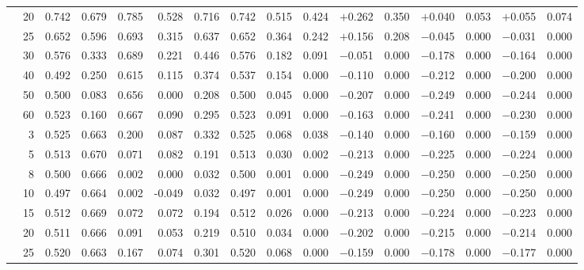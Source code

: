 \documentclass[conference]{IEEEtran}
\theoremstyle{remark}
\begin{document}
\begin{table}[t]
{\begin{tabular}{p{2.2cm}r rrrr rr rr rr rr rr}
  & 20 & 0.742 & 0.679 & 0.785 & 0.528 & 0.716 & 0.742 & 0.515 & 0.424 & $+$0.262 & 0.350 & $+$0.040 & 0.053 & $+$0.055 & 0.074 \\
  & 25 & 0.652 & 0.596 & 0.693 & 0.315 & 0.637 & 0.652 & 0.364 & 0.242 & $+$0.156 & 0.208 & $-$0.045 & 0.000 & $-$0.031 & 0.000 \\
  & 30 & 0.576 & 0.333 & 0.689 & 0.221 & 0.446 & 0.576 & 0.182 & 0.091 & $-$0.051 & 0.000 & $-$0.178 & 0.000 & $-$0.164 & 0.000 \\
  & 40 & 0.492 & 0.250 & 0.615 & 0.115 & 0.374 & 0.537 & 0.154 & 0.000 & $-$0.110 & 0.000 & $-$0.212 & 0.000 & $-$0.200 & 0.000 \\
  & 50 & 0.500 & 0.083 & 0.656 & 0.000 & 0.208 & 0.500 & 0.045 & 0.000 & $-$0.207 & 0.000 & $-$0.249 & 0.000 & $-$0.244 & 0.000 \\
  & 60 & 0.523 & 0.160 & 0.667 & 0.090 & 0.295 & 0.523 & 0.091 & 0.000 & $-$0.163 & 0.000 & $-$0.241 & 0.000 & $-$0.230 & 0.000 \\
\midrule
{}
  & 3  & 0.525 & 0.663 & 0.200 & 0.087 & 0.332 & 0.525 & 0.068 & 0.038 & $-$0.140 & 0.000 & $-$0.160 & 0.000 & $-$0.159 & 0.000 \\
  & 5  & 0.513 & 0.670 & 0.071 & 0.082 & 0.191 & 0.513 & 0.030 & 0.002 & $-$0.213 & 0.000 & $-$0.225 & 0.000 & $-$0.224 & 0.000 \\
  & 8  & 0.500 & 0.666 & 0.002 & 0.000 & 0.032 & 0.500 & 0.001 & 0.000 & $-$0.249 & 0.000 & $-$0.250 & 0.000 & $-$0.250 & 0.000 \\
  & 10 & 0.497 & 0.664 & 0.002 & -0.049 & 0.032 & 0.497 & 0.001 & 0.000 & $-$0.249 & 0.000 & $-$0.250 & 0.000 & $-$0.250 & 0.000 \\
  & 15 & 0.512 & 0.669 & 0.072 & 0.072 & 0.194 & 0.512 & 0.026 & 0.000 & $-$0.213 & 0.000 & $-$0.224 & 0.000 & $-$0.223 & 0.000 \\
  & 20 & 0.511 & 0.666 & 0.091 & 0.053 & 0.219 & 0.510 & 0.034 & 0.000 & $-$0.202 & 0.000 & $-$0.215 & 0.000 & $-$0.214 & 0.000 \\
  & 25 & 0.520 & 0.663 & 0.167 & 0.074 & 0.301 & 0.520 & 0.068 & 0.000 & $-$0.159 & 0.000 & $-$0.178 & 0.000 & $-$0.177 & 0.000 \\

\end{tabular}}
\end{table}
\end{document}
